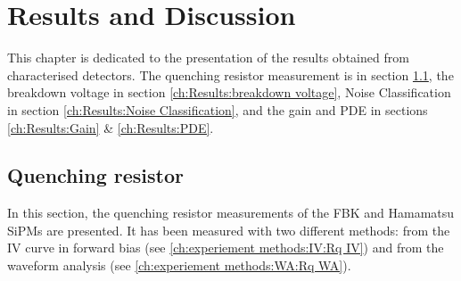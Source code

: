 \chapter{Results and Discussion}
\label{ch:Results}
This chapter is dedicated to the presentation of the results obtained from characterised detectors. The quenching resistor measurement is in section \ref{ch:Results:Rq}, the breakdown voltage in section \ref{ch:Results:breakdown voltage}, Noise Classification in section \ref{ch:Results:Noise Classification}, and the gain and PDE in sections \ref{ch:Results:Gain} \& \ref{ch:Results:PDE}.

\section{Quenching resistor}
\label{ch:Results:Rq}
 In this section, the quenching resistor measurements of the FBK and Hamamatsu SiPMs are presented. It has been measured with two different methods: from the IV curve in forward bias (see \ref{ch:experiement methods:IV:Rq IV}) and from the waveform analysis (see \ref{ch:experiement methods:WA:Rq WA}).  
 
